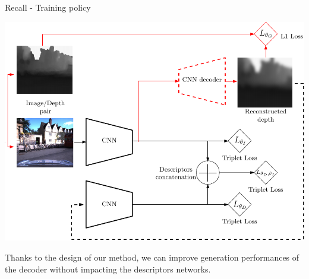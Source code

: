 \begin{frame}{Recall - Training policy}
	\begin{minipage}{0.6\linewidth}
		\centering
		\includegraphics[width=\linewidth]{vect/method/fig3/6}	
	\end{minipage}\hfill
	\begin{minipage}{0.3\linewidth}
		\raggedright
		Thanks to the design of our method, we can improve generation performances of the decoder without impacting the descriptors networks.
		
	\end{minipage}			
\end{frame}

